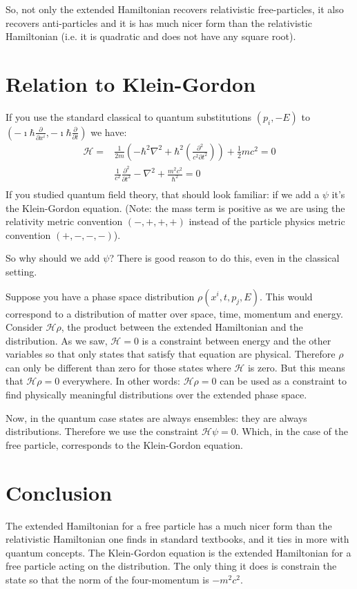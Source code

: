 \documentclass[aps,pra,10pt,floatfix,nofootinbib]{revtex4-1}
\theoremstyle{definition}
\begin{document}
So, not only the extended Hamiltonian recovers relativistic free-particles, it also recovers anti-particles and it is has much nicer form than the relativistic Hamiltonian (i.e. it is quadratic and does not have any square root).


\section{Relation to Klein-Gordon}

If you use the standard classical to quantum substitutions $\left( p_i, -E \right)$ to $\left(-\imath \hbar \frac{\partial}{\partial x^i}, -\imath \hbar \frac{\partial}{\partial t} \right)$ we have:
\begin{equation}
\begin{aligned}
\mathcal{H} = &\frac{1}{2m} \left(- \hbar^2 \nabla^2 + \hbar^2 \left(\frac{\partial^2}{c^2\partial t^2}\right)\right)  + \frac{1}{2} mc^2 = 0\\
&\frac{1}{c^2}\frac{\partial^2}{\partial t^2}- \nabla^2 + \frac{m^2 c^2}{\hbar^2}  = 0\\
\end{aligned}
\label{KleinGordon}
\end{equation}
If you studied quantum field theory, that should look familiar: if we add a $\psi$ it's the Klein-Gordon equation. (Note: the mass term is positive as we are using the relativity metric convention $(-,+,+,+)$ instead of the particle physics metric convention $(+, -, -, -)$).

So why should we add $\psi$? There is good reason to do this, even in the classical setting.

Suppose you have a phase space distribution $\rho(x^i,t,p_j,E)$. This would correspond to a distribution of matter over space, time, momentum and energy. Consider $\mathcal{H} \rho$, the product between the extended Hamiltonian and the distribution. As we saw, $\mathcal{H}=0$ is a constraint between energy and the other variables so that only states that satisfy that equation are physical. Therefore $\rho$ can only be different than zero for those states where $\mathcal{H}$ is zero. But this means that $\mathcal{H} \rho = 0$ everywhere. In other words: $\mathcal{H} \rho = 0$ can be used as a constraint to find physically meaningful distributions over the extended phase space.

Now, in the quantum case states are always ensembles: they are always distributions. Therefore we use the constraint $\mathcal{H}\psi = 0$. Which, in the case of the free particle, corresponds to the Klein-Gordon equation.

\section{Conclusion}

The extended Hamiltonian for a free particle has a much nicer form than the relativistic Hamiltonian one finds in standard textbooks, and it ties in more with quantum concepts. The Klein-Gordon equation is the extended Hamiltonian for a free particle acting on the distribution. The only thing it does is constrain the state so that the norm of the four-momentum is $-m^2c^2$.
\end{document}
